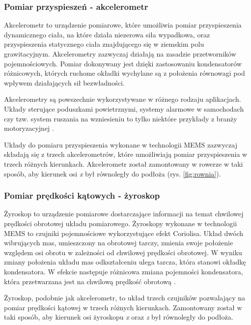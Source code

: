 \subsubsection{Pomiar przyspieszeń - akcelerometr}
Akcelerometr to urządzenie pomiarowe, które umożliwia pomiar przyspieszenia dynamicznego ciała, na które działa niezerowa siła wypadkowa, oraz przyspieszenia statycznego ciała znajdującego się w ziemskim polu grawitacyjnym. Akcelerometry zazwyczaj działają na zasadzie przetworników pojemnościowych. Pomiar dokonywany jest dzięki zastosowaniu kondensatorów różnicowych, których ruchome okładki wychylane są z położenia równowagi pod wpływem działających sił bezwładności.

Akcelerometry są powszechnie wykorzystywane w różnego rodzaju aplikacjach. Układy sterujące poduszkami powietrznymi, systemy alarmowe w samochodach czy tzw. system ruszania na wzniesieniu to tylko niektóre przykłady z branży motoryzacyjnej \cite{stAkcel}.

Układy do pomiaru przyspieszenia wykonane w technologii MEMS zazwyczaj składają się z trzech akcelerometrów, które umożliwiają pomiar przyspieszenia w trzech różnych kierunkach. Akcelerometr został zamontowany w rowerze w taki sposób, aby kierunek osi \textit{x} był równoległy do podłoża (rys. \ref{fig:rownia}).
\subsubsection{Pomiar prędkości kątowych - żyroskop}
Żyroskop to urządzenie pomiarowe dostarczające informacji na temat chwilowej prędkości obrotowej układu pomiarowego. Żyroskopy wykonane w technologii MEMS to czujniki pojemnościowe wykorzystujące efekt Coriolisa. Układ dwóch wibrujących mas, umieszczony na obrotowej tarczy, zmienia swoje położenie względem osi obrotu w zależności od chwilowej prędkości obrotowej. W wyniku zmiany położenia układu mas odkształceniu ulega tarcza, która stanowi okładkę kondensatora. W efekcie następuje różnicowa zmiana pojemności kondensatora, która przetwarzana jest na chwilową prędkość obrotową \cite{stGyro}.

Żyroskop, podobnie jak akcelerometr, to układ trzech czujników pozwalający na pomiar prędkości kątowej w trzech różnych kierunkach. Zamontowany został w taki sposób, aby kierunek osi żyroskopu \textit{x} oraz \textit{z}  był równoległy do podłoża.

